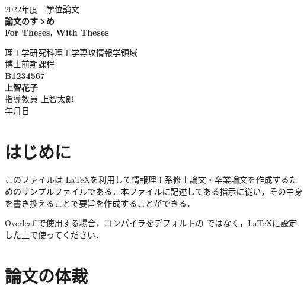 \documentclass[a4paper,twocolumn]{report}
\begin{document}
\begin{titlepage}
    \begin{center}
        \Large 2022年度　学位論文 \\

        \vfill
        \Huge\textbf{論文のすゝめ}\\
        \ifSUB
            \huge\textbf{For Theses, With Theses}\\
        \fi

        \vfill
        \Large 理工学研究科理工学専攻情報学領域 \\
        \medskip
        \Large 博士前期課程 \\
        \vspace{\baselineskip}
        \Large \textbf{B1234567} \\
        \smallskip
        \Large \textbf{上智花子} \\
        \vspace{\baselineskip}
        \large 指導教員 \quad 上智太郎\\

        \vspace{3\baselineskip}
        \number\year 年\number\month 月\number\day 日
    \end{center}

    \ifSAM
    \fi
\end{titlepage}

\cleardoublepage
{}
\tableofcontents
\cleardoublepage
{}

\chapter{はじめに}

このファイルは \LaTeX を利用して情報理工系修士論文・卒業論文を作成するためのサンプルファイルである．本ファイルに記述してある指示に従い，その中身を書き換えることで要旨を作成することができる．

Overleaf で使用する場合，コンパイラをデフォルトの \pdflatex ではなく，\LaTeX に設定した上で使ってください．

\chapter{論文の体裁}
\end{document}

